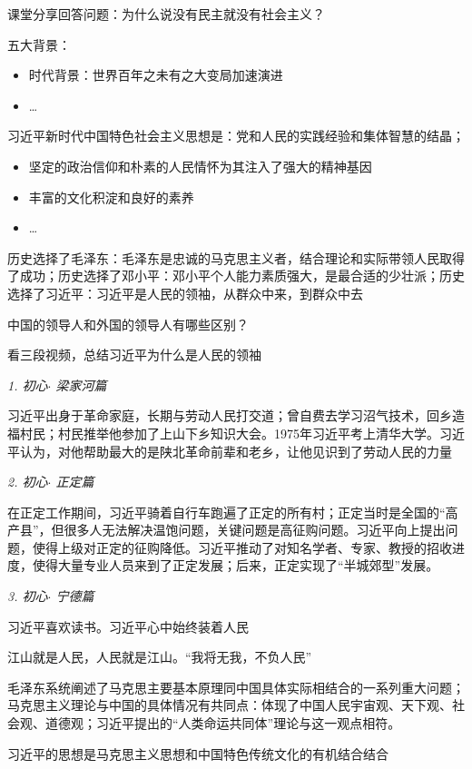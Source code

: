 \begin{notation}
    课堂分享回答问题：为什么说没有民主就没有社会主义？
\end{notation}
五大背景：
\begin{itemize}
    \item 时代背景：世界百年之未有之大变局加速演进
    \item \ldots 
    
\end{itemize}
\begin{defi}
    习近平新时代中国特色社会主义思想是：党和人民的实践经验和集体智慧的结晶；
    \begin{itemize}
        \item 坚定的政治信仰和朴素的人民情怀为其注入了强大的精神基因
        \item 丰富的文化积淀和良好的素养
        \item \ldots 
        
    \end{itemize}
\end{defi}
历史选择了毛泽东：毛泽东是忠诚的马克思主义者，结合理论和实际带领人民取得了成功；历史选择了邓小平：邓小平个人能力素质强大，是最合适的少壮派；历史选择了习近平：习近平是人民的领袖，从群众中来，到群众中去
\begin{question}
    中国的领导人和外国的领导人有哪些区别？

    看三段视频，总结习近平为什么是人民的领袖
\end{question}

\textit{1. 初心$\cdot $ 梁家河篇}

习近平出身于革命家庭，长期与劳动人民打交道；曾自费去学习沼气技术，回乡造福村民；村民推举他参加了上山下乡知识大会。1975年习近平考上清华大学。习近平认为，对他帮助最大的是陕北革命前辈和老乡，让他见识到了劳动人民的力量

\textit{2. 初心$\cdot $ 正定篇}

在正定工作期间，习近平骑着自行车跑遍了正定的所有村；正定当时是全国的“高产县”，但很多人无法解决温饱问题，关键问题是高征购问题。习近平向上提出问题，使得上级对正定的征购降低。习近平推动了对知名学者、专家、教授的招收进度，使得大量专业人员来到了正定发展；后来，正定实现了“半城郊型”发展。

\textit{3. 初心$\cdot $ 宁德篇}

习近平喜欢读书。习近平心中始终装着人民
\begin{notation}
江山就是人民，人民就是江山。“我将无我，不负人民”
\end{notation}
毛泽东系统阐述了马克思主要基本原理同中国具体实际相结合的一系列重大问题；马克思主义理论与中国的具体情况有共同点：体现了中国人民宇宙观、天下观、社会观、道德观；习近平提出的“人类命运共同体”理论与这一观点相符。

习近平的思想是马克思主义思想和中国特色传统文化的有机结合结合
